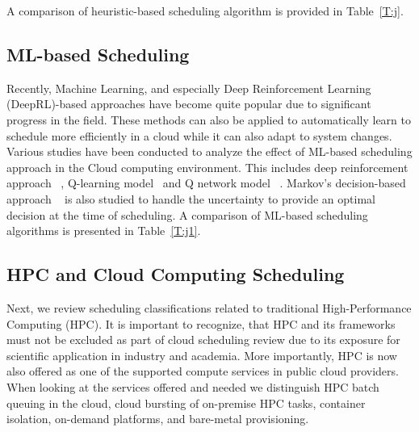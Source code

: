 \documentclass[final,5p,times,twocolumn]{elsarticle}
\begin{document}
A comparison of heuristic-based scheduling algorithm is provided in Table~\ref{T:j}.

%


\subsection{ML-based Scheduling}\label{sec:AI}

Recently, Machine Learning, and especially Deep Reinforcement Learning (DeepRL)-based approaches have become quite popular due to significant progress in the field. These methods can also be applied to automatically learn to schedule more efficiently in a cloud while it can also adapt to system changes. Various studies have been conducted to analyze the effect of ML-based scheduling approach in the Cloud computing environment. This includes deep reinforcement approach ~\cite{cheng2018drl,mao2018learning}, Q-learning model~\cite{zhang2017energy} and Q network model ~\cite{wang2019multi}. Markov's decision-based approach ~\cite{barrett2013applying} is also studied to handle the uncertainty to provide an optimal decision at the time of scheduling. A comparison of ML-based scheduling algorithms is presented in Table~\ref{T:j1}.

%



\subsection{HPC and Cloud Computing Scheduling}
\label{sec:hpc}


Next, we review scheduling classifications related to traditional High-Performance Computing (HPC). It is important to recognize, that HPC and its frameworks must not be excluded as part of cloud scheduling review due to its exposure for scientific application in industry and academia. More importantly, HPC is now also offered as one of the supported compute services in public cloud providers. When looking at the services offered and needed we distinguish HPC batch queuing in the cloud, cloud bursting of on-premise HPC tasks, container isolation, on-demand platforms, and bare-metal provisioning.
\end{document}
